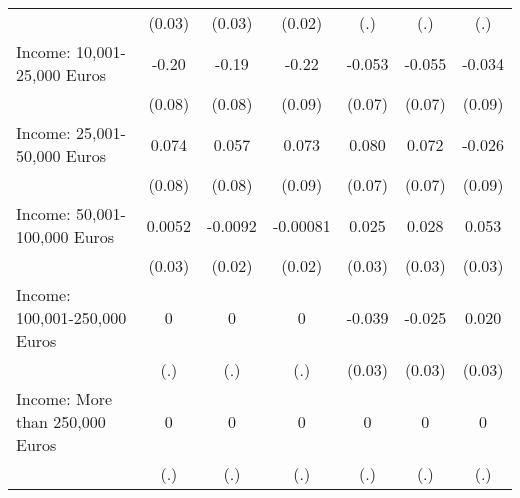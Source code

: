 {\begin{tabular}{l*{6}{c}}
            &      (0.03)         &      (0.03)         &      (0.02)         &         (.)         &         (.)         &         (.)         \\
\addlinespace
Income: 10,001-25,000 Euros&       -0.20\sym{**} &       -0.19\sym{*}  &       -0.22\sym{*}  &      -0.053         &      -0.055         &      -0.034         \\
            &      (0.08)         &      (0.08)         &      (0.09)         &      (0.07)         &      (0.07)         &      (0.09)         \\
\addlinespace
Income: 25,001-50,000 Euros&       0.074         &       0.057         &       0.073         &       0.080         &       0.072         &      -0.026         \\
            &      (0.08)         &      (0.08)         &      (0.09)         &      (0.07)         &      (0.07)         &      (0.09)         \\
\addlinespace
Income: 50,001-100,000 Euros&      0.0052         &     -0.0092         &    -0.00081         &       0.025         &       0.028         &       0.053         \\
            &      (0.03)         &      (0.02)         &      (0.02)         &      (0.03)         &      (0.03)         &      (0.03)         \\
\addlinespace
Income: 100,001-250,000 Euros&           0         &           0         &           0         &      -0.039         &      -0.025         &       0.020         \\
            &         (.)         &         (.)         &         (.)         &      (0.03)         &      (0.03)         &      (0.03)         \\
\addlinespace
Income: More than 250,000 Euros&           0         &           0         &           0         &           0         &           0         &           0         \\
            &         (.)         &         (.)         &         (.)         &         (.)         &         (.)         &         (.)         \\
\bottomrule
\end{tabular}
}
